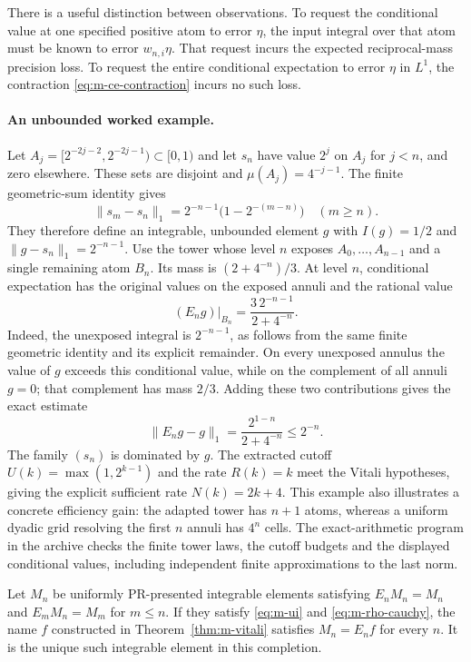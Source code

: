 There is a useful distinction between observations.  To request the
conditional value at one specified positive atom to error $\eta$, the
input integral over that atom must be known to error $w_{n,i}\eta$.
That request incurs the expected reciprocal-mass precision loss.  To
request the entire conditional expectation to error $\eta$ in $L^1$,
the contraction \eqref{eq:m-ce-contraction} incurs no such loss.

\paragraph{An unbounded worked example.}
Let
$A_j=[2^{-2j-2},2^{-2j-1})\subset[0,1)$ and let $s_n$ have value $2^j$
on $A_j$ for $j<n$, and zero elsewhere.  These sets are disjoint and
$\mu(A_j)=4^{-j-1}$.  The finite geometric-sum identity gives
\[
 \|s_m-s_n\|_1
   =2^{-n-1}\bigl(1-2^{-(m-n)}\bigr)\quad(m\ge n).
\]
They therefore define an integrable, unbounded element $g$ with
$I(g)=1/2$ and $\|g-s_n\|_1=2^{-n-1}$.  Use the tower whose level $n$
exposes $A_0,\ldots,A_{n-1}$ and a single remaining atom $B_n$.  Its mass
is $(2+4^{-n})/3$.  At level $n$, conditional expectation has the original
values on the exposed annuli and the rational value
\[
 (E_ng)|_{B_n}
   =\frac{3\,2^{-n-1}}{2+4^{-n}}.
\]
Indeed, the unexposed integral is $2^{-n-1}$, as follows from the same
finite geometric identity and its explicit remainder.  On every
unexposed annulus the value of $g$ exceeds this conditional value, while
on the complement of all annuli $g=0$; that complement has mass $2/3$.
Adding these two contributions gives the exact estimate
\[
 \|E_ng-g\|_1=\frac{2^{1-n}}{2+4^{-n}}\le2^{-n}.
\]
The family $(s_n)$ is dominated by $g$.  The extracted cutoff
$U(k)=\max(1,2^{k-1})$ and the rate $R(k)=k$ meet the Vitali hypotheses,
giving the explicit sufficient rate $N(k)=2k+4$.  This example also
illustrates a concrete efficiency gain: the adapted tower has $n+1$
atoms, whereas a uniform dyadic grid resolving the first $n$ annuli has
$4^n$ cells.  The exact-arithmetic program in the archive checks the
finite tower laws, the cutoff budgets and the displayed conditional
values, including independent finite approximations to the last norm.

\begin{corollary}
\label{cor:m-martingale}
Let $M_n$ be uniformly PR-presented integrable elements satisfying
$E_nM_n=M_n$ and $E_mM_n=M_m$ for $m\le n$.  If they satisfy
\eqref{eq:m-ui} and \eqref{eq:m-rho-cauchy}, the name $f$ constructed in
Theorem~\ref{thm:m-vitali} satisfies $M_n=E_nf$ for every $n$.  It is the
unique such integrable element in this completion.
\end{corollary}

